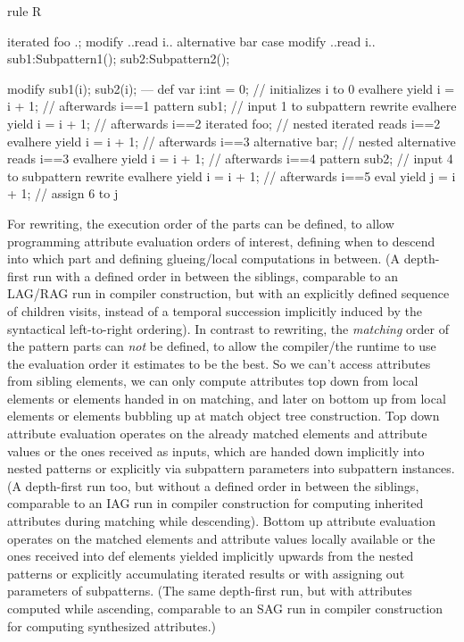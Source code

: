 \begin{example}
  \begin{grgen}
rule R {
  iterated foo { .; modify { ..read i.. } }
  alternative bar { case { modify { ..read i.. } } } 
  sub1:Subpattern1();
  sub2:Subpattern2();

  modify {
    sub1(i);
    sub2(i);
  ---
    def var i:int = 0; // initializes i to 0
    evalhere { yield i = i + 1; } // afterwards i==1
    pattern sub1; // input 1 to subpattern rewrite
    evalhere { yield i = i + 1; } // afterwards i==2
    iterated foo; // nested iterated reads i==2 
    evalhere { yield i = i + 1; } // afterwards i==3
    alternative bar; // nested alternative reads i==3
    evalhere { yield i = i + 1; } // afterwards i==4
    pattern sub2; // input 4 to subpattern rewrite
    evalhere { yield i = i + 1; } // afterwards i==5
    eval { yield j = i + 1; } // assign 6 to j
  }
}
  \end{grgen}
\end{example}

\begin{note}
For rewriting, the execution order of the parts can be defined, to allow programming attribute evaluation orders of interest, defining when to descend into which part and defining glueing/local computations in between.
(A depth-first run with a defined order in between the siblings, comparable to an LAG/RAG run in compiler construction, but with an explicitly defined sequence of children visits, instead of a temporal succession implicitly induced by the syntactical left-to-right ordering).
In contrast to rewriting, the \emph{matching} order of the pattern parts can \emph{not} be defined, to allow the compiler/the runtime to use the evaluation order it estimates to be the best.
So we can't access attributes from sibling elements, we can only compute attributes top down from local elements or elements handed in on matching, and later on bottom up from local elements or elements bubbling up at match object tree construction.
Top down attribute evaluation operates on the already matched elements and attribute values or the ones received as inputs, which are handed down implicitly into nested patterns or explicitly via subpattern parameters into subpattern instances. (A depth-first run too, but without a defined order in between the siblings, comparable to an IAG run in compiler construction for computing inherited attributes during matching while descending).
Bottom up attribute evaluation operates on the matched elements and attribute values locally available or the ones received into def elements yielded implicitly upwards from the nested patterns or explicitly accumulating iterated results or with assigning out parameters of subpatterns. (The same depth-first run, but with attributes computed while ascending, comparable to an SAG run in compiler construction for computing synthesized attributes.)
\end{note}

